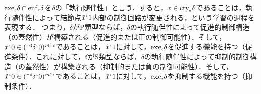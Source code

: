 \noindent $ \mathrm{exe}_{\epsilon}\delta\cap\mathrm{enf}_{\epsilon}\delta $を$ \delta $の「執行随伴性」と言う．すると，$x\in\mathrm{cty}_{\epsilon}\delta$であることは，執行随伴性によって結節点$\tilde{x}{\mspace{1mu}{`}\mspace{1mu}} 1$内部の制御回路が変更される，という学習の過程を表現する．
つまり，$\delta$がP類型ならば，$\delta$の執行随伴性によって促進的制御構造（の蓋然性）が構築される（促進的または正の制御可能性）．そして，$\tilde{x}{\mspace{1mu}{`}\mspace{1mu}} 0\in(\tilde{\:\:}{^\triangleleft}\delta{\mspace{1mu}{`}\mspace{1mu}} 0)^{:n\mathbin{\upharpoonleft}\epsilon}$であることは，$\tilde{x}{\mspace{1mu}{`}\mspace{1mu}} 1$に対して，$\mathrm{exe}_{\epsilon}\delta$を促進する機能を持つ（促進条件）．これに対して，$\delta$がS類型ならば，$\delta$の執行随伴性によって抑制的制御構造（の蓋然性）が構築される（抑制的または負の制御可能性）．そして，$\tilde{x}{\mspace{1mu}{`}\mspace{1mu}} 0\in(\tilde{\:\:}{^\triangleleft}\delta{\mspace{1mu}{`}\mspace{1mu}} 0)^{:n\mathbin{\upharpoonleft}\epsilon}$であることは，$\tilde{x}{\mspace{1mu}{`}\mspace{1mu}} 1$に対して，$\mathrm{exe}_{\epsilon}\delta$を抑制する機能を持つ（抑制条件）．

